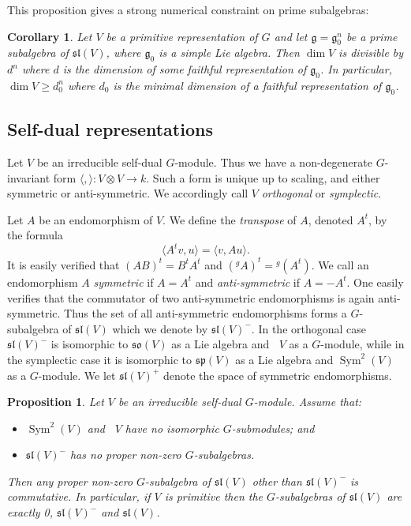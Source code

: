 \documentclass{amsart}
\newtheorem{corollary}[theorem]{Corollary}
\newtheorem{proposition}[theorem]{Proposition}
\theoremstyle{definition}
\theoremstyle{remark}
\DeclareMathOperator{\Sym}{Sym}
\DeclareMathOperator{\bw}{{\bigwedge}^{\! 2}}
\let\mf\mathfrak
\begin{document}
This proposition gives a strong numerical constraint on prime
subalgebras:

\begin{corollary}
\label{cor:prime-constraint}
Let $V$ be a primitive representation of $G$ and let $\mf{g}=\mf{g}_0^n$ be a
prime subalgebra of $\mf{sl}(V)$, where $\mf{g}_0$ is a simple Lie algebra.
Then $\dim{V}$ is divisible by $d^n$ where $d$ is the dimension of some
faithful representation of $\mf{g}_0$.  In particular, $\dim{V} \ge d_0^n$
where $d_0$ is the minimal dimension of a faithful representation of
$\mf{g}_0$.
\end{corollary}


\subsection{Self-dual representations}

Let $V$ be an irreducible self-dual $G$-module.  Thus we have a non-degenerate
$G$-invariant form $\langle, \rangle:V \otimes V \to k$.  Such a form is
unique up to scaling, and either symmetric or anti-symmetric.  We accordingly
call $V$ \emph{orthogonal} or \emph{symplectic}.

Let $A$ be an endomorphism of $V$.  We define the \emph{transpose} of $A$,
denoted $A^t$, by the formula
\begin{displaymath}
\langle A^t v, u \rangle=\langle v, Au \rangle.
\end{displaymath}
It is easily verified that $(AB)^t=B^t A^t$ and $({}^g A)^t={}^g (A^t)$.
We call an endomorphism $A$ \emph{symmetric} if $A=A^t$ and
\emph{anti-symmetric} if $A=-A^t$.  One easily verifies that the commutator
of two anti-symmetric endomorphisms is again anti-symmetric.  Thus the set of
all anti-symmetric endomorphisms forms a $G$-subalgebra of $\mf{sl}(V)$ which
we denote by $\mf{sl}(V)^-$.  In the orthogonal case $\mf{sl}(V)^-$ is
isomorphic to $\mf{so}(V)$ as a Lie algebra and $\bw{V}$ as a $G$-module,
while in the symplectic case it is isomorphic to $\mf{sp}(V)$ as a Lie algebra
and $\Sym^2(V)$ as a $G$-module.  We let $\mf{sl}(V)^+$ denote the space of
symmetric endomorphisms.

\begin{proposition}
\label{prop:self-dual}
Let $V$ be an irreducible self-dual $G$-module.  Assume that:
\begin{itemize}
\item $\Sym^2(V)$ and $\bw{V}$ have no isomorphic $G$-submodules; and
\item $\mf{sl}(V)^-$ has no proper non-zero $G$-subalgebras.
\end{itemize}
Then any proper non-zero $G$-subalgebra of $\mf{sl}(V)$ other than
$\mf{sl}(V)^-$ is commutative.  In particular, if $V$ is primitive then the
$G$-subalgebras of $\mf{sl}(V)$ are exactly 0, $\mf{sl}(V)^-$ and
$\mf{sl}(V)$.
\end{proposition}
\end{document}

